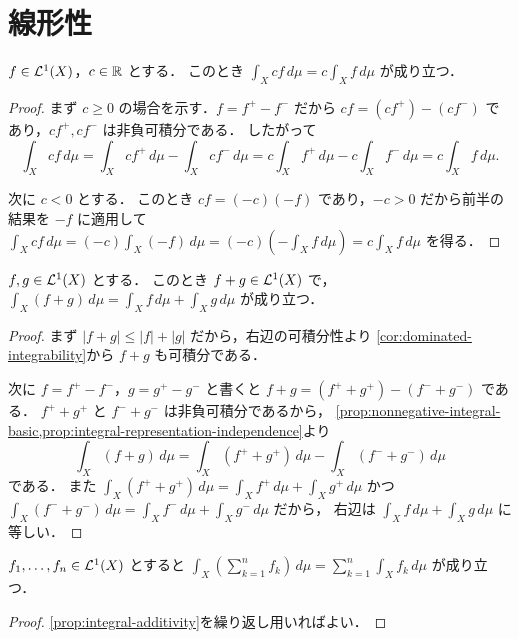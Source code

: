 \section{線形性}

\begin{proposition}[斉次性]\label{prop:integral-homogeneity}
$f\in\mathcal L^1(X)$，$c \in \mathbb R$ とする．
このとき $\int_X cf\,d\mu=c\int_X f\,d\mu$ が成り立つ．
\end{proposition}
\begin{proof}
まず $c\ge 0$ の場合を示す．$f=f^+-f^-$ だから $cf=(cf^+)-(cf^-)$ であり，$cf^+,cf^-$ は非負可積分である．
したがって
\[
\int_X cf\,d\mu
=\int_X cf^+\,d\mu-\int_X cf^-\,d\mu
=c\int_X f^+\,d\mu-c\int_X f^-\,d\mu
=c\int_X f\,d\mu.
\]

次に $c<0$ とする．
このとき $cf=(-c)(-f)$ であり，$-c>0$ だから前半の結果を $-f$ に適用して
$\int_X cf\,d\mu=(-c)\int_X (-f)\,d\mu=(-c)(-\int_X f\,d\mu)=c\int_X f\,d\mu$ を得る．
\end{proof}

\begin{proposition}[加法性]\label{prop:integral-additivity}
$f,g\in\mathcal L^1(X)$ とする．
このとき $f+g\in\mathcal L^1(X)$ で，
$\int_X (f+g)\,d\mu=\int_X f\,d\mu+\int_X g\,d\mu$ が成り立つ．
\end{proposition}
\begin{proof}
まず $|f+g|\le |f|+|g|$ だから，右辺の可積分性より
\cref{cor:dominated-integrability}から $f+g$ も可積分である．

次に $f=f^+-f^-$，$g=g^+-g^-$ と書くと $f+g=(f^++g^+)-(f^-+g^-)$ である．
$f^++g^+$ と $f^-+g^-$ は非負可積分であるから，
\cref{prop:nonnegative-integral-basic,prop:integral-representation-independence}より
\[
\int_X (f+g)\,d\mu
=\int_X (f^++g^+)\,d\mu-\int_X (f^-+g^-)\,d\mu
\]
である．
また $\int_X (f^++g^+)\,d\mu=\int_X f^+\,d\mu+\int_X g^+\,d\mu$ かつ
$\int_X (f^-+g^-)\,d\mu=\int_X f^-\,d\mu+\int_X g^-\,d\mu$ だから，
右辺は $\int_X f\,d\mu+\int_X g\,d\mu$ に等しい．
\end{proof}

\begin{corollary}[有限和]\label{cor:integral-finite-sum}
$f_1,\dots,f_n\in\mathcal L^1(X)$ とすると
$\int_X (\sum_{k=1}^n f_k)\,d\mu=\sum_{k=1}^n \int_X f_k\,d\mu$ が成り立つ．
\end{corollary}
\begin{proof}
\cref{prop:integral-additivity}を繰り返し用いればよい．
\end{proof}

